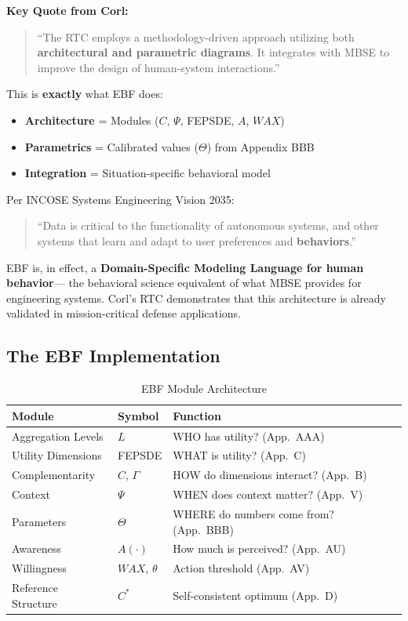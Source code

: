 \textbf{Key Quote from Corl:}
\begin{quote}
``The RTC employs a methodology-driven approach utilizing both \textbf{architectural
and parametric diagrams}. It integrates with MBSE to improve the design of
human-system interactions.''
\end{quote}

This is \textbf{exactly} what EBF does:
\begin{itemize}[nosep]
    \item \textbf{Architecture} = Modules ($C$, $\Psi$, FEPSDE, $A$, $WAX$)
    \item \textbf{Parametrics} = Calibrated values ($\Theta$) from Appendix BBB
    \item \textbf{Integration} = Situation-specific behavioral model
\end{itemize}

Per INCOSE Systems Engineering Vision 2035:
\begin{quote}
``Data is critical to the functionality of autonomous systems, and other systems that
learn and adapt to user preferences and \textbf{behaviors}.''
\end{quote}

EBF is, in effect, a \textbf{Domain-Specific Modeling Language for human behavior}---
the behavioral science equivalent of what MBSE provides for engineering systems.
Corl's RTC demonstrates that this architecture is already validated in
mission-critical defense applications.

\subsection{The EBF Implementation}

\begin{table}[htbp]
\centering
\caption{EBF Module Architecture}
\label{tab:ebf-modules}
\renewcommand{\arraystretch}{1.3}
\begin{tabular}{@{}llp{6cm}@{}}
\toprule
\textbf{Module} & \textbf{Symbol} & \textbf{Function} \\
\midrule
Aggregation Levels & $L$ & WHO has utility? (App.\ AAA) \\
Utility Dimensions & FEPSDE & WHAT is utility? (App.\ C) \\
Complementarity & $C$, $\Gamma$ & HOW do dimensions interact? (App.\ B) \\
Context & $\Psi$ & WHEN does context matter? (App.\ V) \\
Parameters & $\Theta$ & WHERE do numbers come from? (App.\ BBB) \\
Awareness & $A(\cdot)$ & How much is perceived? (App.\ AU) \\
Willingness & $WAX$, $\theta$ & Action threshold (App.\ AV) \\
Reference Structure & $C^*$ & Self-consistent optimum (App.\ D) \\
\bottomrule
\end{tabular}
\end{table}


